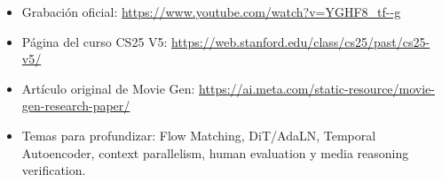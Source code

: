 \documentclass[a4paper]{article}
\begin{document}
\begin{itemize}[itemsep=0.2em,topsep=0.2em]
  \item Grabación oficial: \url{https://www.youtube.com/watch?v=YGHF8_tf--g}
  \item Página del curso CS25 V5: \url{https://web.stanford.edu/class/cs25/past/cs25-v5/}
  \item Artículo original de Movie Gen: \url{https://ai.meta.com/static-resource/movie-gen-research-paper/}
  \item Temas para profundizar: Flow Matching, DiT/AdaLN, Temporal Autoencoder, context parallelism, human evaluation y media reasoning verification.
\end{itemize}
\end{document}
